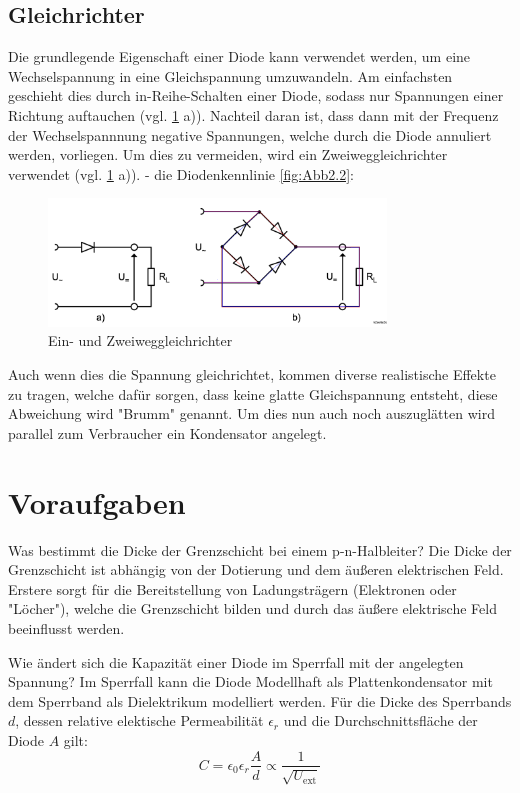 \documentclass{article}
\theoremstyle{definition}
\begin{document}
    \subsection{Gleichrichter}
    Die grundlegende Eigenschaft einer Diode kann verwendet werden, um eine Wechselspannung in eine Gleichspannung umzuwandeln. Am einfachsten geschieht dies durch in-Reihe-Schalten einer Diode, sodass nur Spannungen einer Richtung auftauchen (vgl. \ref{fig:Abb2.4mod} a)). Nachteil daran ist, dass dann mit der Frequenz der Wechselspannnung negative Spannungen, welche durch die Diode annuliert werden, vorliegen. Um dies zu vermeiden, wird ein Zweiweggleichrichter verwendet (vgl. \ref{fig:Abb2.4mod} a)).
    - die Diodenkennlinie \ref{fig:Abb2.2}:
    \begin{figure}[H]
        \centering
        \includegraphics[width=0.8\textwidth]{figs/fig2_4mod.png}
        \caption{Ein- und Zweiweggleichrichter\cite{anleitung}}
        \label{fig:Abb2.4mod}
    \end{figure}
    

    Auch wenn dies die Spannung gleichrichtet, kommen diverse realistische Effekte zu tragen, welche dafür sorgen, dass keine glatte Gleichspannung entsteht, diese Abweichung wird "Brumm" genannt. Um dies nun auch noch auszuglätten wird parallel zum Verbraucher ein Kondensator angelegt.
\section{Voraufgaben}

    \begin{voraufgabe}{Was bestimmt die Dicke der Grenzschicht bei einem p-n-Halbleiter?}
        Die Dicke der Grenzschicht ist abhängig von der Dotierung und dem äußeren elektrischen Feld. Erstere sorgt für die Bereitstellung von Ladungsträgern (Elektronen oder "Löcher"), welche die Grenzschicht bilden und durch das äußere elektrische Feld beeinflusst werden.
    \end{voraufgabe}
    \begin{voraufgabe}{Wie ändert sich die Kapazität einer Diode im Sperrfall mit der angelegten Spannung?}
        Im Sperrfall kann die Diode Modellhaft als Plattenkondensator mit dem Sperrband als Dielektrikum modelliert werden. Für die Dicke des Sperrbands $d$, dessen relative elektische Permeabilität $\epsilon_r$ und die Durchschnittsfläche der Diode $A$ gilt:
        \begin{equation}
            C = \epsilon_0 \epsilon_r \frac{A}{d} \propto \frac{1}{\sqrt{U_\mathrm{ext}}}
            \label{Kapazität einer Diode}
        \end{equation}
    \end{voraufgabe}
    
\end{document}
